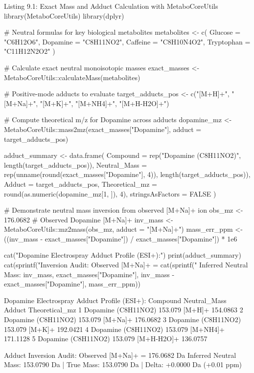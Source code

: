 \documentclass[11pt,twoside,openright]{book}
\begin{document}
\begin{rchunk}{Listing 9.1: Exact Mass and Adduct Calculation with MetaboCoreUtils}
library(MetaboCoreUtils)
library(dplyr)

# Neutral formulas for key biological metabolites
metabolites <- c(
  Glucose     = "C6H12O6",
  Dopamine    = "C8H11NO2",
  Caffeine    = "C8H10N4O2",
  Tryptophan  = "C11H12N2O2"
)

# Calculate exact neutral monoisotopic masses
exact_masses <- MetaboCoreUtils::calculateMass(metabolites)

# Positive-mode adducts to evaluate
target_adducts_pos <- c("[M+H]+", "[M+Na]+", "[M+K]+", "[M+NH4]+", "[M+H-H2O]+")

# Compute theoretical m/z for Dopamine across adducts
dopamine_mz <- MetaboCoreUtils::mass2mz(exact_masses["Dopamine"], adduct = target_adducts_pos)

adduct_summary <- data.frame(
  Compound       = rep("Dopamine (C8H11NO2)", length(target_adducts_pos)),
  Neutral_Mass   = rep(unname(round(exact_masses["Dopamine"], 4)), length(target_adducts_pos)),
  Adduct         = target_adducts_pos,
  Theoretical_mz = round(as.numeric(dopamine_mz[1, ]), 4),
  stringsAsFactors = FALSE
)

# Demonstrate neutral mass inversion from observed [M+Na]+ ion
obs_mz <- 176.0682   # Observed Dopamine [M+Na]+
inv_mass <- MetaboCoreUtils::mz2mass(obs_mz, adduct = "[M+Na]+")
mass_err_ppm <- ((inv_mass - exact_masses["Dopamine"]) / exact_masses["Dopamine"]) * 1e6

cat("Dopamine Electrospray Adduct Profile (ESI+):\n")
print(adduct_summary)
cat(sprintf("\nAdduct Inversion Audit: Observed [M+Na]+ = %
cat(sprintf("  Inferred Neutral Mass: %
            inv_mass, exact_masses["Dopamine"], inv_mass - exact_masses["Dopamine"], mass_err_ppm))
\end{rchunk}

\begin{routput}
Dopamine Electrospray Adduct Profile (ESI+):
             Compound Neutral\_Mass     Adduct Theoretical\_mz
1 Dopamine (C8H11NO2)      153.079     [M+H]+       154.0863
2 Dopamine (C8H11NO2)      153.079    [M+Na]+       176.0682
3 Dopamine (C8H11NO2)      153.079     [M+K]+       192.0421
4 Dopamine (C8H11NO2)      153.079   [M+NH4]+       171.1128
5 Dopamine (C8H11NO2)      153.079 [M+H-H2O]+       136.0757

Adduct Inversion Audit: Observed [M+Na]+ = 176.0682 Da
  Inferred Neutral Mass: 153.0790 Da | True Mass: 153.0790 Da | Delta: +0.0000 Da (+0.01 ppm)
\end{routput}
\end{document}
